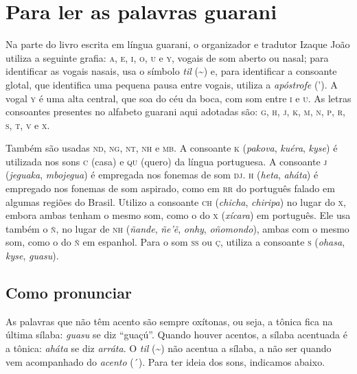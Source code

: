 \chapter{Para ler as palavras guarani}

Na parte do livro escrita em língua guarani, o organizador e tradutor Izaque João utiliza a seguinte grafia: \textsc{a}, \textsc{e}, \textsc{i}, \textsc{o}, \textsc{u} e \textsc{y}, vogais de som aberto ou nasal; para identificar as vogais nasais, usa o símbolo \textit{til} (\textasciitilde{}) e, para identificar a consoante
glotal, que identifica uma pequena pausa entre vogais, utiliza a
\textit{apóstrofe} ('). A vogal \textsc{y} é uma alta central, que soa do céu da boca, com
som entre \textsc{i} e \textsc{u}. As letras consoantes presentes no alfabeto guarani aqui
adotadas são: \textsc{g}, \textsc{h}, \textsc{j}, \textsc{k}, \textsc{m}, \textsc{n}, \textsc{p}, \textsc{r}, \textsc{s}, \textsc{t}, \textsc{v} e \textsc{x}.

Também são usadas \textsc{nd}, \textsc{ng}, \textsc{nt}, \textsc{nh} e \textsc{mb}. A consoante \textsc{k} (\textit{pakova}, \textit{kuéra}, \textit{kyse}) é utilizada nos sons \textsc{c} (casa) e \textsc{qu} (quero) da língua portuguesa. A consoante \textsc{j} (\textit{jeguaka}, \textit{mbojegua}) é empregada nos fonemas de som \textsc{dj}. \textsc{h} (\textit{heta}, \textit{aháta}) é empregado nos
fonemas de som aspirado, como em \textsc{rr} do português falado em algumas
regiões do Brasil. Utilizo a consoante \textsc{ch} (\textit{chicha},
\textit{chiripa}) no lugar do \textsc{x}, embora ambas tenham o mesmo som, como o
do \textsc{x} (\textit{xícara}) em português. Ele usa também o \textsc{ñ}, no lugar de \textsc{nh} (\textit{ñande}, \textit{ñe'ẽ}, \textit{onhy}, \textit{oñomondo}), ambas com o mesmo som, como o do \textsc{ñ} em espanhol. Para o som \textsc{ss} ou \textsc{ç}, utiliza a consoante \textsc{s} (\textit{ohasa}, \textit{kyse}, \textit{guasu}).


\section{Como pronunciar}

As palavras que não têm acento são sempre oxítonas, ou seja, a tônica
fica na última sílaba: \textit{guasu} se diz ``guaçú''. Quando houver
acentos, a sílaba acentuada é a tônica: \textit{aháta} se diz
\textit{arráta}. O \textit{til} (\textasciitilde{}) não acentua a sílaba, a não ser
quando vem acompanhado do \textit{acento} (´). Para ter ideia dos sons, indicamos abaixo.

